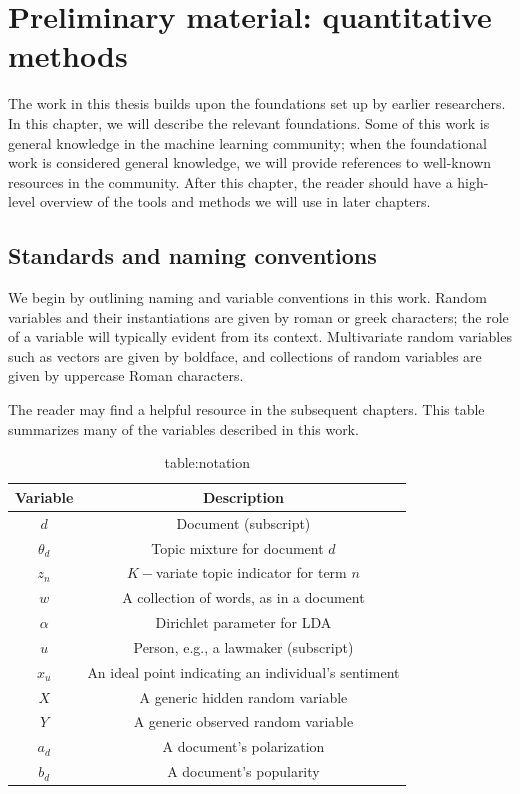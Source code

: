 \chapter{Preliminary material: quantitative methods}
The work in this thesis builds upon the foundations set up by earlier
researchers.  In this chapter, we will describe the relevant
foundations.  Some of this work is general knowledge in the machine
learning community; when the foundational work is considered general
knowledge, we will provide references to well-known resources in the
community.  After this chapter, the reader should have a high-level overview of the tools and methods we will use in later chapters.

\section{Standards and naming conventions}
  We begin by outlining naming and variable conventions in this work.
  Random variables and their instantiations are given by roman or
  greek characters; the role of a variable will typically evident from
  its context.  Multivariate random variables such as vectors are
  given by boldface, and collections of random variables are given by
  uppercase Roman characters.

  The reader may find  a helpful resource in the
  subsequent chapters.  This table summarizes many of the variables
  described in this work.
  \begin{table}
    \caption{table:notation}
    \begin{center}
      \begin{tabular}{|c|c|}
      \hline
      \textbf{Variable} & \textbf{Description} \\
      \hline
      $d$ & Document (subscript) \\
      $\theta_d$ & Topic mixture for document $d$ \\
      $z_n$ & $K-$variate topic indicator for term $n$ \\
      $w$ & A collection of words, as in a document \\
      $\alpha$ & Dirichlet parameter for LDA \\
      $u$ & Person, e.g., a lawmaker (subscript) \\
      $x_u$ & An ideal point indicating an individual's sentiment \\
      $X$ & A generic hidden random variable \\
      $Y$ & A generic observed random variable \\
      $a_d$ & A document's polarization \\
      $b_d$ & A document's popularity \\
      \hline
    \end{tabular}
    \end{center}
  \end{table}

